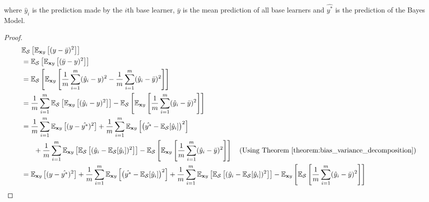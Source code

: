 \documentclass{article}
\begin{document}
\begin{center}
    \begin{minipage}{0.8\linewidth}
        \small
        where $\hat{y}_i$ is the prediction made by the $i$th base learner, $\bar{y}$ is the mean prediction of all base learners and $\hat{y^*}$ is the prediction of the Bayes Model. 
    \end{minipage}
    \begin{proof}
        \begin{align*}
            &\mathbb{E}_{\mathcal{S}}\left[\mathbb{E}_{\mathbf{x}y}\left[(y - \bar{y})^2\right]\right]
            \\
            &= \mathbb{E}_{\mathcal{S}}\left[\mathbb{E}_{\mathbf{x}y}\left[(\bar{y} - y)^2\right]\right]
            \\
            &= \mathbb{E}_{\mathcal{S}}\left[\mathbb{E}_{\mathbf{x}y}\left[\frac{1}{m} \sum_{i=1}^{m} (\hat{y}_i - y)^2 - \frac{1}{m} \sum_{i=1}^{m} (\hat{y}_i - \bar{y})^2\right]\right]
            \\
            &= \frac{1}{m} \sum_{i=1}^{m} \mathbb{E}_{\mathcal{S}}\left[\mathbb{E}_{\mathbf{x}y}\left[(\hat{y}_i - y)^2\right]\right] - \mathbb{E}_{\mathcal{S}}\left[\mathbb{E}_{\mathbf{x}y}\left[\frac{1}{m} \sum_{i=1}^{m} (\hat{y}_i - \bar{y})^2\right]\right]
            \\
            &= \frac{1}{m} \sum_{i=1}^{m} \mathbb{E}_{\mathbf{x}y}\left[(y - \hat{y^*})^2\right] + \frac{1}{m} \sum_{i=1}^{m} \mathbb{E}_{\mathbf{x}y}\left[\left(\hat{y^*} - \mathbb{E}_{\mathcal{S}}[\hat{y}_i]\right)^2\right]
            \\
            &\phantom{=} \quad + \frac{1}{m} \sum_{i=1}^{m} \mathbb{E}_{\mathbf{x}y}\left[\mathbb{E}_{\mathcal{S}}\left[(\hat{y}_i - \mathbb{E}_{\mathcal{S}}[\hat{y}_i])^2\right]\right] - \mathbb{E}_{\mathcal{S}}\left[\mathbb{E}_{\mathbf{x}y}\left[\frac{1}{m} \sum_{i=1}^{m} (\hat{y}_i - \bar{y})^2\right]\right] \quad \text{(Using Theorem~\ref{theorem:bias_variance_decomposition})}
            \\
            &= \mathbb{E}_{\mathbf{x}y}\left[(y - \hat{y^*})^2\right] + \frac{1}{m} \sum_{i=1}^{m} \mathbb{E}_{\mathbf{x}y}\left[\left(\hat{y^*} - \mathbb{E}_{\mathcal{S}}[\hat{y}_i]\right)^2\right] + \frac{1}{m} \sum_{i=1}^{m} \mathbb{E}_{\mathbf{x}y}\left[\mathbb{E}_{\mathcal{S}}\left[(\hat{y}_i - \mathbb{E}_{\mathcal{S}}[\hat{y}_i])^2\right]\right] - \mathbb{E}_{\mathbf{x}y}\left[\mathbb{E}_{\mathcal{S}}\left[\frac{1}{m} \sum_{i=1}^{m} (\hat{y}_i - \bar{y})^2\right]\right]
            \\

\end{align*}
\end{proof}
\end{center}
\end{document}
